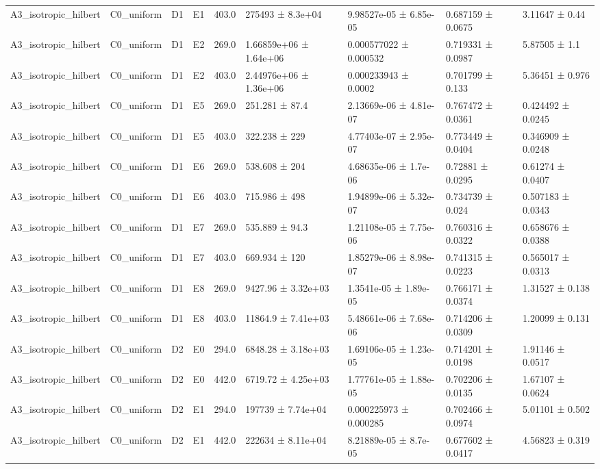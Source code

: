 \begin{table}
\begin{tabular}{lllllllll}
A3\_isotropic\_hilbert & C0\_uniform & D1 & E1 & 403.0 & 275493 ± 8.3e+04 & 9.98527e-05 ± 6.85e-05 & 0.687159 ± 0.0675 & 3.11647 ± 0.44 \\
A3\_isotropic\_hilbert & C0\_uniform & D1 & E2 & 269.0 & 1.66859e+06 ± 1.64e+06 & 0.000577022 ± 0.000532 & 0.719331 ± 0.0987 & 5.87505 ± 1.1 \\
A3\_isotropic\_hilbert & C0\_uniform & D1 & E2 & 403.0 & 2.44976e+06 ± 1.36e+06 & 0.000233943 ± 0.0002 & 0.701799 ± 0.133 & 5.36451 ± 0.976 \\
A3\_isotropic\_hilbert & C0\_uniform & D1 & E5 & 269.0 & 251.281 ± 87.4 & 2.13669e-06 ± 4.81e-07 & 0.767472 ± 0.0361 & 0.424492 ± 0.0245 \\
A3\_isotropic\_hilbert & C0\_uniform & D1 & E5 & 403.0 & 322.238 ± 229 & 4.77403e-07 ± 2.95e-07 & 0.773449 ± 0.0404 & 0.346909 ± 0.0248 \\
A3\_isotropic\_hilbert & C0\_uniform & D1 & E6 & 269.0 & 538.608 ± 204 & 4.68635e-06 ± 1.7e-06 & 0.72881 ± 0.0295 & 0.61274 ± 0.0407 \\
A3\_isotropic\_hilbert & C0\_uniform & D1 & E6 & 403.0 & 715.986 ± 498 & 1.94899e-06 ± 5.32e-07 & 0.734739 ± 0.024 & 0.507183 ± 0.0343 \\
A3\_isotropic\_hilbert & C0\_uniform & D1 & E7 & 269.0 & 535.889 ± 94.3 & 1.21108e-05 ± 7.75e-06 & 0.760316 ± 0.0322 & 0.658676 ± 0.0388 \\
A3\_isotropic\_hilbert & C0\_uniform & D1 & E7 & 403.0 & 669.934 ± 120 & 1.85279e-06 ± 8.98e-07 & 0.741315 ± 0.0223 & 0.565017 ± 0.0313 \\
A3\_isotropic\_hilbert & C0\_uniform & D1 & E8 & 269.0 & 9427.96 ± 3.32e+03 & 1.3541e-05 ± 1.89e-05 & 0.766171 ± 0.0374 & 1.31527 ± 0.138 \\
A3\_isotropic\_hilbert & C0\_uniform & D1 & E8 & 403.0 & 11864.9 ± 7.41e+03 & 5.48661e-06 ± 7.68e-06 & 0.714206 ± 0.0309 & 1.20099 ± 0.131 \\
A3\_isotropic\_hilbert & C0\_uniform & D2 & E0 & 294.0 & 6848.28 ± 3.18e+03 & 1.69106e-05 ± 1.23e-05 & 0.714201 ± 0.0198 & 1.91146 ± 0.0517 \\
A3\_isotropic\_hilbert & C0\_uniform & D2 & E0 & 442.0 & 6719.72 ± 4.25e+03 & 1.77761e-05 ± 1.88e-05 & 0.702206 ± 0.0135 & 1.67107 ± 0.0624 \\
A3\_isotropic\_hilbert & C0\_uniform & D2 & E1 & 294.0 & 197739 ± 7.74e+04 & 0.000225973 ± 0.000285 & 0.702466 ± 0.0974 & 5.01101 ± 0.502 \\
A3\_isotropic\_hilbert & C0\_uniform & D2 & E1 & 442.0 & 222634 ± 8.11e+04 & 8.21889e-05 ± 8.7e-05 & 0.677602 ± 0.0417 & 4.56823 ± 0.319 \\

\end{tabular}
\end{table}
